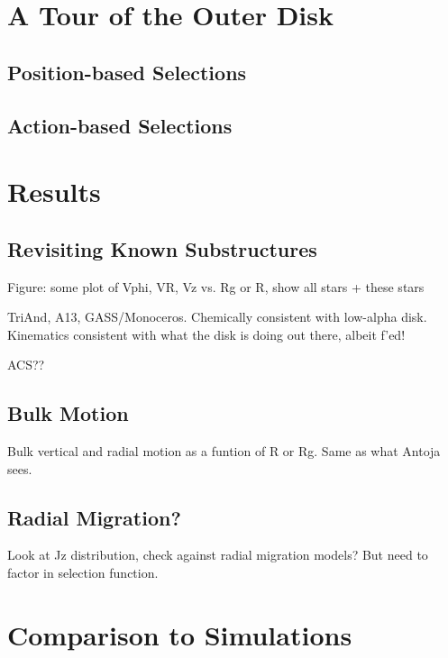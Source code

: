 \documentclass[modern]{aastex63}
\begin{document}
\section{A Tour of the Outer Disk}
\label{sec:tour}

\subsection{Position-based Selections}
\label{sec:sel-positions}

\subsection{Action-based Selections}
\label{sec:sel-actions}



\section{Results}
\label{sec:results}

\subsection{Revisiting Known Substructures}
\label{sec:triandplus}

Figure: some plot of Vphi, VR, Vz vs. Rg or R, show all stars + these stars

TriAnd, A13, GASS/Monoceros. Chemically consistent with low-alpha disk. Kinematics consistent with what the disk is doing out there, albeit f'ed!

ACS??

\subsection{Bulk Motion}
\label{sec:bulkmotion}

Bulk vertical and radial motion as a funtion of R or Rg. Same as what Antoja sees.

\subsection{Radial Migration?}
\label{sec:radialmigration}

Look at Jz distribution, check against radial migration models? But need to factor in selection function.



\section{Comparison to Simulations}
\label{sec:sims}
\end{document}
